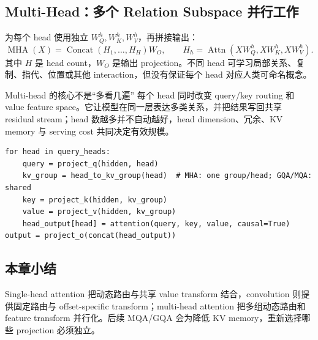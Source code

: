 \subsection{Multi-Head：多个 Relation Subspace 并行工作}

为每个 head 使用独立 $W_Q^h,W_K^h,W_V^h$，再拼接输出：
\[
\operatorname{MHA}(X)=\operatorname{Concat}(H_1,\ldots,H_H)W_O,
\qquad H_h=\operatorname{Attn}(XW_Q^h,XW_K^h,XW_V^h).
\]
其中 $H$ 是 head count，$W_O$ 是输出 projection。不同 head 可学习局部关系、复制、指代、位置或其他 interaction，但没有保证每个 head 对应人类可命名概念。


\begin{importantbox}{Multi-head 的核心不是“多看几遍”}
每个 head 同时改变 query/key routing 和 value feature space。它让模型在同一层表达多类关系，并把结果写回共享 residual stream；head 数越多并不自动越好，head dimension、冗余、KV memory 与 serving cost 共同决定有效规模。
\end{importantbox}

\begin{lstlisting}[caption={Multi-head attention 与共享 KV 的概念结构}]
for head in query_heads:
    query = project_q(hidden, head)
    kv_group = head_to_kv_group(head)  # MHA: one group/head; GQA/MQA: shared
    key = project_k(hidden, kv_group)
    value = project_v(hidden, kv_group)
    head_output[head] = attention(query, key, value, causal=True)
output = project_o(concat(head_output))
\end{lstlisting}


\subsection{本章小结}

Single-head attention 把动态路由与共享 value transform 结合，convolution 则提供固定路由与 offset-specific transform；multi-head attention 把多组动态路由和 feature transform 并行化。后续 MQA/GQA 会为降低 KV memory，重新选择哪些 projection 必须独立。

